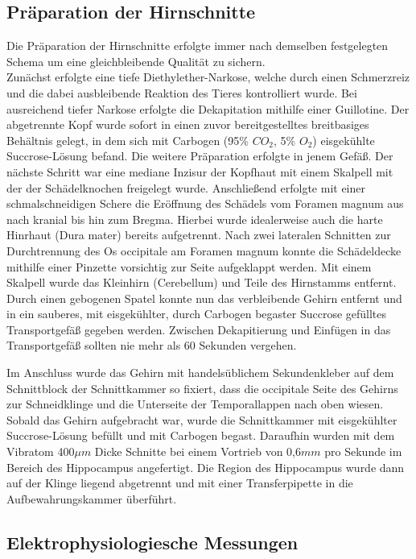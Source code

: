 \documentclass[a4paper,11pt]{report}
\begin{document}
{\subsection{Präparation der Hirnschnitte}
Die Präparation der Hirnschnitte erfolgte immer nach demselben festgelegten Schema um eine gleichbleibende Qualität zu sichern.\\
Zunächst erfolgte eine tiefe Diethylether-Narkose, welche durch einen Schmerzreiz und die dabei ausbleibende Reaktion des Tieres kontrolliert wurde. Bei ausreichend tiefer Narkose erfolgte die Dekapitation mithilfe einer Guillotine. Der abgetrennte Kopf wurde sofort in einen zuvor bereitgestelltes breitbasiges Behältnis gelegt, in dem sich mit Carbogen (95$\%$ $CO_2$, 5$\%$ $O_2$) eisgekühlte Succrose-Lösung befand. Die weitere Präparation erfolgte in jenem Gefäß. Der nächste Schritt war eine mediane Inzisur der Kopfhaut mit einem Skalpell mit der der Schädelknochen freigelegt wurde. Anschließend erfolgte mit einer schmalschneidigen Schere die Eröffnung des Schädels vom Foramen magnum aus nach kranial bis hin zum Bregma. Hierbei wurde idealerweise auch die harte Hinrhaut (Dura mater) bereits aufgetrennt. Nach zwei lateralen Schnitten zur Durchtrennung des Os occipitale am Foramen magnum konnte die Schädeldecke mithilfe einer Pinzette vorsichtig zur Seite aufgeklappt werden. Mit einem Skalpell wurde das Kleinhirn (Cerebellum) und Teile des Hirnstamms entfernt. Durch einen gebogenen Spatel konnte nun das verbleibende Gehirn entfernt und in ein sauberes, mit eisgekühlter, durch Carbogen begaster Succrose gefülltes Transportgefäß gegeben werden. Zwischen Dekapitierung und Einfügen in das Transportgefäß sollten nie mehr als 60 Sekunden vergehen. 

Im Anschluss wurde das Gehirn mit handelsüblichem Sekundenkleber auf dem Schnittblock der Schnittkammer so fixiert, dass die occipitale Seite des Gehirns zur Schneidklinge und die Unterseite der Temporallappen nach oben wiesen. Sobald das Gehirn aufgebracht war, wurde die Schnittkammer mit eisgekühlter Succrose-Lösung befüllt und mit Carbogen begast. Daraufhin wurden mit dem Vibratom 400$\mu m$ Dicke Schnitte bei einem Vortrieb von 0,6$mm$ pro Sekunde im Bereich des Hippocampus angefertigt. Die Region des Hippocampus wurde dann auf der Klinge liegend abgetrennt und mit einer Transferpipette in die Aufbewahrungskammer überführt. 

\subsection{Elektrophysiologiesche Messungen} 

}
\end{document}
